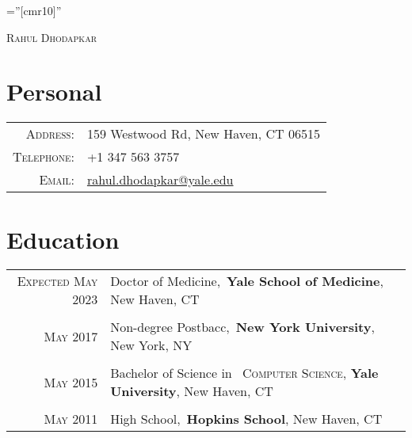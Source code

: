 \documentclass[a4paper,10pt]{article}
\begin{document}

\pagestyle{empty} %

\font\fb=''[cmr10]'' %

\par{\centering
		{\Huge \textsc{Rahul Dhodapkar}
	}\bigskip\par}

\section{Personal}

\begin{tabular}{rl}
    \textsc{Address:}   & 159 Westwood Rd, New Haven, CT 06515 \\
    \textsc{Telephone:}      & +1 347 563 3757\\
    \textsc{Email:}       & \href{mailto:rahul.dhodapkar@yale.edu}{rahul.dhodapkar@yale.edu}
\end{tabular}

\section{Education}
\begin{tabular}{rl}	
 \textsc{Expected} \textsc{May} 2023 & Doctor of Medicine,\
 \textbf{Yale School of Medicine}, New Haven, CT\\
\\
 \textsc{May} 2017 & Non-degree Postbacc,\
 \textbf{New York University}, New York, NY\\
\\
 \textsc{May} 2015 & Bachelor of Science in \
 \textsc{Computer Science}, \textbf{Yale University}, New Haven, CT\\
\\
\textsc{May} 2011 & High School,\
 \normalsize \textbf{Hopkins School}, New Haven, CT\\
\end{tabular}
\end{document}
